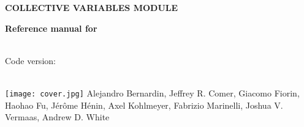 \documentclass[11pt]{article}
\begin{document}
\ifdefined\HCode

\fi



\ifdefined\HCode
{}
\fi

\begin{titlepage}

  \noindent\colorbox{background-color}{
    \begin{minipage}{1.0\textwidth}

        $\,$\\
        
        \noindent\textsf{\bfseries\Huge COLLECTIVE VARIABLES MODULE\\}
        
        \noindent\textsf{\bfseries\Huge Reference manual for \MDENGINE{} }

        \noindent\textsf{\\Code version: \cvversion\\}

      \end{minipage}}

  \ifdefined\HCode
  \\
  \else
  \texttt{[image: cover.jpg]}
  \fi
  \textsf{\large Alejandro Bernardin, Jeffrey R.{} Comer, Giacomo Fiorin, Haohao Fu, J\'er\^ome H\'enin, Axel Kohlmeyer, Fabrizio Marinelli, Joshua V.{} Vermaas, Andrew D.{} White}
\end{titlepage}

\newpage
\tableofcontents
\newpage


\newcommand{\key}[5]{%
  \index{#2!\texttt{#1}}
  {\bf \large \tt #1 } $\langle\,$#3$\,\rangle$ \\%
  {\bf Context: } #2 \\%
  {\bf Acceptable values: } #4 \\%
  {\bf Description: } #5%
}
\newcommand{\keydef}[6]{%
  \index{#2!\texttt{#1}}
  {\bf \large \tt #1 } $\langle\,$#3$\,\rangle$ \\%
  {\bf Context: } #2 \\%
  {\bf Acceptable values: } #4 \\%
  {\bf Default value: } #5 \\%
  {\bf Description: } #6
}
\newcommand{\labelkey}[1]{\hypertarget{#1}{}\label{#1}}
\newcommand{\refkey}[2]{\hyperlink{#2}{\texttt{#1}}}
\newcommand{\dupkey}[4]{%
  \index{#2!\texttt{#1}}
  {\bf \large \tt #1:} see definition of \hyperlink{#3}{\texttt{#1}} in sec.~\ref{#3} (#4)%
}
\newcommand{\simkey}[3]{%
  \index{#2!\texttt{#1}}
  {\bf \large \tt #1:} analogous to \texttt{#3}%
}
\end{document}
